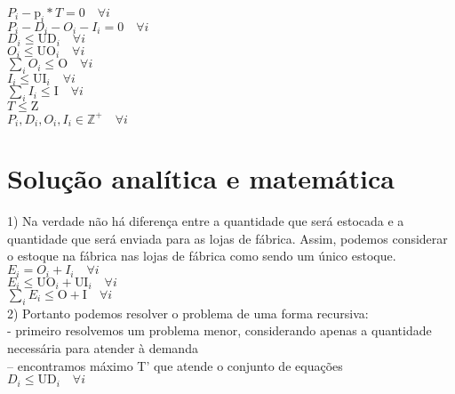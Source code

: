 \documentclass{book}
\begin{document}
$P_i - \textrm{p}_i * T  = 0 \quad \forall i$ \\

$P_i - D_i - O_i - I_i = 0 \quad \forall i$ \\

$D_i \leq \textrm{UD}_i \quad \forall i$ \\

$O_i \leq \textrm{UO}_i \quad \forall i$ \\

$\sum_i{O_i} \leq \textrm{O} \quad \forall i$ \\

$I_i \leq \textrm{UI}_i \quad \forall i$ \\

$\sum_i{I_i} \leq \textrm{I} \quad \forall i$ \\

$T \leq \textrm{Z}$ \\

$P_i, D_i, O_i, I_i \in  \mathbb{Z}^+ \quad \forall i$


\section{Solução analítica e matemática}

1) Na verdade não há diferença entre a quantidade que será estocada e a quantidade que será enviada para as lojas de fábrica. Assim, podemos considerar o estoque na fábrica nas lojas de fábrica como sendo um único estoque. \\

$E_i = O_i + I_i \quad \forall i $ \\

$E_i \leq \textrm{UO}_i + \textrm{UI}_i \quad \forall i$ \\

$\sum_i{E_i} \leq \textrm{O} + \textrm{I} \quad \forall i$ \\

2) Portanto podemos resolver o problema de uma forma recursiva: \\

 - primeiro resolvemos um problema menor, considerando apenas a quantidade necessária para atender à demanda \\
 
 		-- encontramos máximo T' que atende o conjunto de equações \\
 		
 		$D_i \leq \textrm{UD}_i \quad \forall i$ \\
 		
\end{document}
